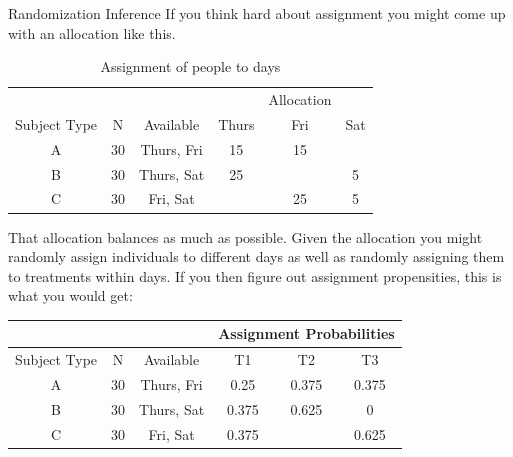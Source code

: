 \documentclass[
  11pt,
  ignorenonframetext,
]{beamer}
\begin{document}
\begin{frame}{Randomization Inference}
\protect\hypertarget{randomization-inference-5}{}
\small If you think hard about assignment you might come up with an
allocation like this.

\begin{table}
  \centering
  \caption{Assignment of people to days}
    \begin{tabular}{ccc|ccc}
          &       &       &       & Allocation &  \\
    Subject Type & N     & Available & Thurs & Fri   & Sat \\ \hline
    A     & 30    & Thurs, Fri & 15    & 15    &  \\
    B     & 30    & Thurs, Sat & 25    &       & 5 \\
    C     & 30    & Fri, Sat &       & 25    & 5 \\
    \end{tabular}
\end{table}

\footnotesize  That allocation balances as much as possible. Given the
allocation you might randomly assign individuals to different days as
well as randomly assigning them to treatments within days. If you then
figure out assignment propensities, this is what you would get:

\begin{table}
  \centering
    \begin{tabular}{cccccc}
          &       &       & \multicolumn{3}{c}{Assignment Probabilities}  \\ \hline
    Subject Type & N     & Available & T1    & T2    & T3 \\ \hline
    A     & 30    & Thurs, Fri & 0.25  & 0.375 & 0.375 \\
    B     & 30    & Thurs, Sat & 0.375 & 0.625 & 0 \\
    C     & 30    & Fri, Sat & 0.375 &       & 0.625 \\ \hline
    \end{tabular}
  
\end{table}
\end{frame}
\end{document}
